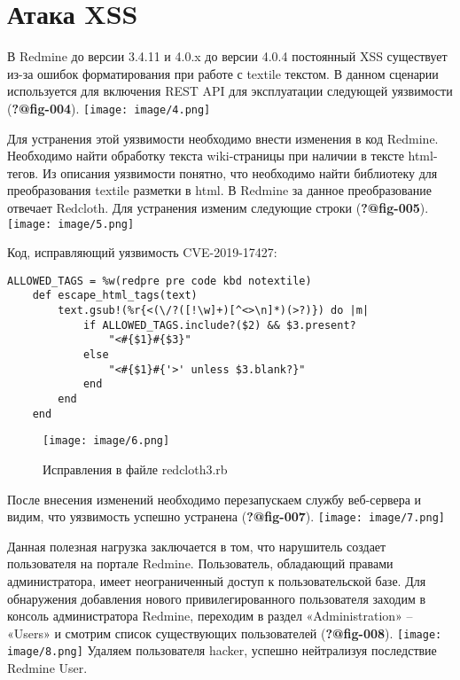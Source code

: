 \documentclass[
  12pt,
  a4paper,
  DIV=11,
  numbers=noendperiod]{scrreprt}
\begin{document}
\hypertarget{ux430ux442ux430ux43aux430-xss}{%
\section{Атака XSS}\label{ux430ux442ux430ux43aux430-xss}}

В Redmine до версии 3.4.11 и 4.0.x до версии 4.0.4 постоянный XSS
существует из-за ошибок форматирования при работе с textile текстом. В
данном сценарии используется для включения REST API для эксплуатации
следующей уязвимости (\textbf{?@fig-004}).
\texttt{[image: image/4.png]}

Для устранения этой уязвимости необходимо внести изменения в код
Redmine. Необходимо найти обработку текста wiki-страницы при наличии в
тексте html-тегов. Из описания уязвимости понятно, что необходимо найти
библиотеку для преобразования textile разметки в html. В Redmine за
данное преобразование отвечает Redcloth. Для устранения изменим
следующие строки (\textbf{?@fig-005}).
\texttt{[image: image/5.png]}

Код, исправляющий уязвимость CVE-2019-17427:

\begin{verbatim}
ALLOWED_TAGS = %w(redpre pre code kbd notextile) 
    def escape_html_tags(text)  
        text.gsub!(%r{<(\/?([!\w]+)[^<>\n]*)(>?)}) do |m| 
            if ALLOWED_TAGS.include?($2) && $3.present? 
                "<#{$1}#{$3}" 
            else 
                "<#{$1}#{'>' unless $3.blank?}" 
            end 
        end 
    end
\end{verbatim}

\begin{figure}

{\centering \texttt{[image: image/6.png]}

}

\caption{\label{fig-006}Исправления в файле redcloth3.rb}

\end{figure}

После внесения изменений необходимо перезапускаем службу веб-сервера и
видим, что уязвимость успешно устранена (\textbf{?@fig-007}).
\texttt{[image: image/7.png]}

Данная полезная нагрузка заключается в том, что нарушитель создает
пользователя на портале Redmine. Пользователь, обладающий правами
администратора, имеет неограниченный доступ к пользовательской базе. Для
обнаружения добавления нового привилегированного пользователя заходим в
консоль администратора Redmine, переходим в раздел «Administration» --
«Users» и смотрим список существующих пользователей
(\textbf{?@fig-008}).
\texttt{[image: image/8.png]}
Удаляем пользователя hacker, успешно нейтрализуя последствие Redmine
User.
\end{document}
